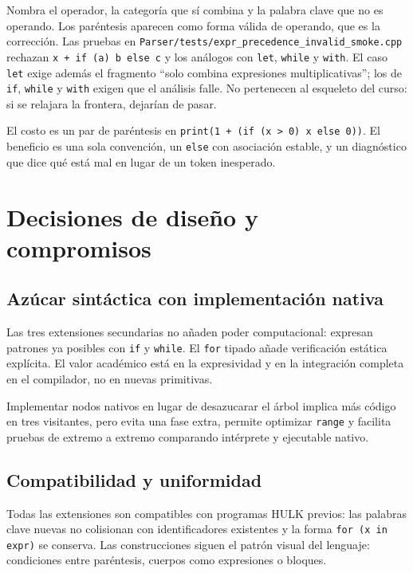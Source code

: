 \documentclass[11pt,a4paper]{article}
\begin{document}
Nombra el operador, la categoría que sí combina y la palabra clave que no es operando. Los paréntesis aparecen como forma válida de operando, que es la corrección. Las pruebas en \texttt{Parser/tests/expr\_precedence\_invalid\_smoke.cpp} rechazan \texttt{x + if (a) b else c} y los análogos con \texttt{let}, \texttt{while} y \texttt{with}. El caso \texttt{let} exige además el fragmento ``solo combina expresiones multiplicativas''; los de \texttt{if}, \texttt{while} y \texttt{with} exigen que el análisis falle. No pertenecen al esqueleto del curso: si se relajara la frontera, dejarían de pasar.

El costo es un par de paréntesis en \texttt{print(1 + (if (x > 0) x else 0))}. El beneficio es una sola convención, un \texttt{else} con asociación estable, y un diagnóstico que dice qué está mal en lugar de un token inesperado.

\section{Decisiones de diseño y compromisos}

\subsection{Azúcar sintáctica con implementación nativa}

Las tres extensiones secundarias no añaden poder computacional: expresan patrones ya posibles con \texttt{if} y \texttt{while}. El \texttt{for} tipado añade verificación estática explícita. El valor académico está en la expresividad y en la integración completa en el compilador, no en nuevas primitivas.

Implementar nodos nativos en lugar de desazucarar el árbol implica más código en tres visitantes, pero evita una fase extra, permite optimizar \texttt{range} y facilita pruebas de extremo a extremo comparando intérprete y ejecutable nativo.

\subsection{Compatibilidad y uniformidad}

Todas las extensiones son compatibles con programas HULK previos: las palabras clave nuevas no colisionan con identificadores existentes y la forma \texttt{for (x in expr)} se conserva. Las construcciones siguen el patrón visual del lenguaje: condiciones entre paréntesis, cuerpos como expresiones o bloques.
\end{document}
